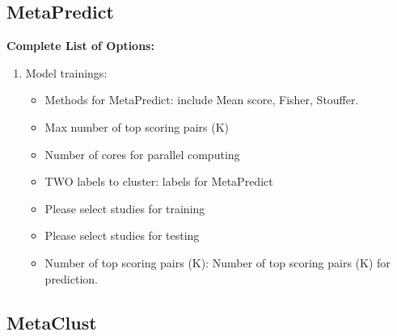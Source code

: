 \subsection{MetaPredict}
\label{sec:completeList_MetaPredict}



\textbf{Complete List of Options:} 
\begin{enumerate}
\item Model trainings: 
\begin{itemize}
\item Methods for MetaPredict: include Mean score, Fisher, Stouffer.
\item Max number of top scoring pairs (K)
\item Number of cores for parallel computing
\item TWO labels to cluster: labels for MetaPredict
\item Please select studies for training
\item Please select studies for testing
\item Number of top scoring pairs (K): Number of top scoring pairs (K) for prediction.
\end{itemize}

\end{enumerate}


\subsection{MetaClust}
\label{sec:completeList_MetaClust}



